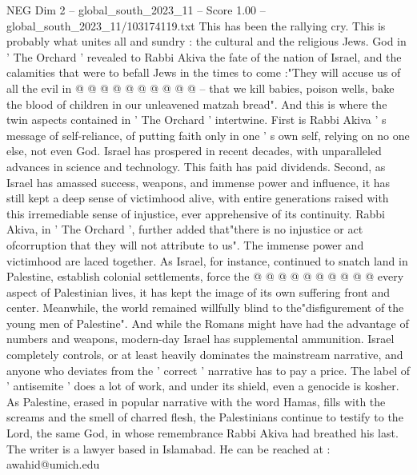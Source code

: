 \begin{textsample}{NEG Dim 2 – global\_south\_2023\_11 – Score 1.00 – global\_south\_2023\_11/103174119.txt}
This has been the rallying cry.
This is probably what unites all and sundry : the cultural and the religious Jews.
God in ' The Orchard ' revealed to Rabbi Akiva the fate of the nation of Israel, and the calamities that were to befall Jews in the times to come :"They will accuse us of all the evil in @ @ @ @ @ @ @ @ @ @ -- that we kill babies, poison wells, bake the blood of children in our unleavened matzah bread".
And this is where the twin aspects contained in ' The Orchard ' intertwine.
First is Rabbi Akiva ' s message of self-reliance, of putting faith only in one ' s own self, relying on no one else, not even God.
Israel has prospered in recent decades, with unparalleled advances in science and technology.
This faith has paid dividends.
Second, as Israel has amassed success, weapons, and immense power and influence, it has still kept a deep sense of victimhood alive, with entire generations raised with this irremediable sense of injustice, ever apprehensive of its continuity.
Rabbi Akiva, in ' The Orchard ', further added that"there is no injustice or act ofcorruption that they will not attribute to us".
The immense power and victimhood are laced together.
As Israel, for instance, continued to snatch land in Palestine, establish colonial settlements, force the @ @ @ @ @ @ @ @ @ @ every aspect of Palestinian lives, it has kept the image of its own suffering front and center.
Meanwhile, the world remained willfully blind to the"disfigurement of the young men of Palestine".
And while the Romans might have had the advantage of numbers and weapons, modern-day Israel has supplemental ammunition.
Israel completely controls, or at least heavily dominates the mainstream narrative, and anyone who deviates from the ' correct ' narrative has to pay a price.
The label of ' antisemite ' does a lot of work, and under its shield, even a genocide is kosher.
As Palestine, erased in popular narrative with the word Hamas, fills with the screams and the smell of charred flesh, the Palestinians continue to testify to the Lord, the same God, in whose remembrance Rabbi Akiva had breathed his last.
The writer is a lawyer based in Islamabad.
He can be reached at : awahid@umich.edu

\end{textsample}
